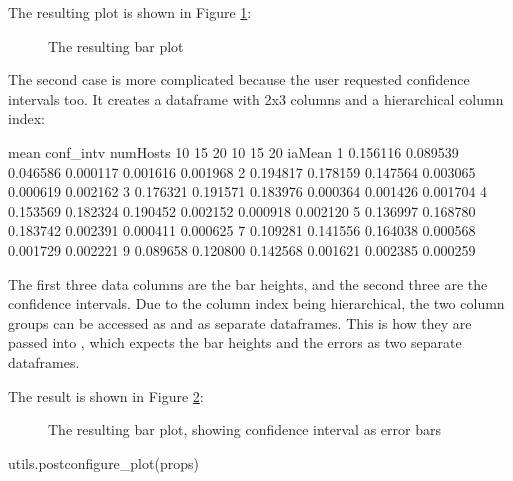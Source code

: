 The resulting plot is shown in Figure \ref{fig:ana-barplot}:

\begin{figure}[htbp]
  \begin{center}
    
    \caption{The resulting bar plot}
    \label{fig:ana-barplot}
  \end{center}
\end{figure}

The second case is more complicated because the user requested confidence
intervals too. It creates a dataframe with 2x3 columns and a hierarchical column
index:

\begin{commandline}
              mean                      conf_intv
numHosts        10        15        20        10        15        20
iaMean
1         0.156116  0.089539  0.046586  0.000117  0.001616  0.001968
2         0.194817  0.178159  0.147564  0.003065  0.000619  0.002162
3         0.176321  0.191571  0.183976  0.000364  0.001426  0.001704
4         0.153569  0.182324  0.190452  0.002152  0.000918  0.002120
5         0.136997  0.168780  0.183742  0.002391  0.000411  0.000625
7         0.109281  0.141556  0.164038  0.000568  0.001729  0.002221
9         0.089658  0.120800  0.142568  0.001621  0.002385  0.000259
\end{commandline}

The first three data columns are the bar heights, and the second three are the
confidence intervals. Due to the column index being hierarchical, the two column
groups can be accessed as  and  as separate
dataframes. This is how they are passed into , which
expects the bar heights and the errors as two separate dataframes.

The result is shown in Figure \ref{fig:ana-barplot-errorbars}:

\begin{figure}[htbp]
  \begin{center}
    
    \caption{The resulting bar plot, showing confidence interval as error bars}
    \label{fig:ana-barplot-errorbars}
  \end{center}
\end{figure}

\begin{python}
utils.postconfigure_plot(props)
\end{python}


